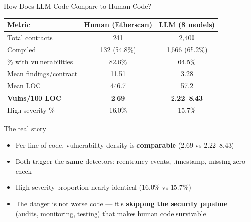\documentclass[aspectratio=169]{beamer}
\begin{document}
\begin{frame}{How Does LLM Code Compare to Human Code?}
\begin{center}
\small
\begin{tabular}{@{}lcc@{}}
\toprule
\textbf{Metric} & \textbf{Human (Etherscan)} & \textbf{LLM (8 models)} \\
\midrule
Total contracts & 241 & 2,400 \\
Compiled & 132 (54.8\%) & 1,566 (65.2\%) \\
\% with vulnerabilities & 82.6\% & 64.5\% \\
Mean findings/contract & 11.51 & 3.28 \\
Mean LOC & 446.7 & 57.2 \\
\textbf{Vulns/100 LOC} & \textbf{2.69} & \textbf{2.22--8.43} \\
High severity \% & 16.0\% & 15.7\% \\
\bottomrule
\end{tabular}
\end{center}

\vspace{0.3cm}
\begin{block}{The real story}
\begin{itemize}\small
    \item Per line of code, vulnerability density is \textbf{comparable} (2.69 vs 2.22--8.43)
    \item Both trigger the \textbf{same} detectors: reentrancy-events, timestamp, missing-zero-check
    \item High-severity proportion nearly identical (16.0\% vs 15.7\%)
    \item The danger is not worse code --- it's \textbf{skipping the security pipeline} (audits, monitoring, testing) that makes human code survivable
\end{itemize}
\end{block}
\end{frame}
\end{document}
